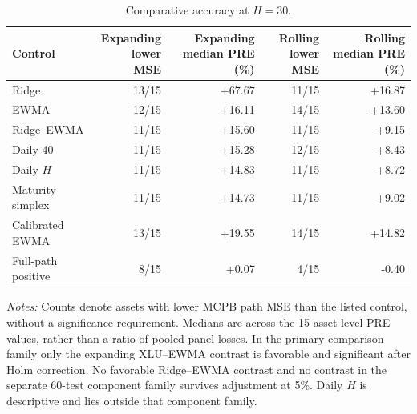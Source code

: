 \begin{table}[tbp]
\centering\small
\setlength{\tabcolsep}{4pt}
\renewcommand{\arraystretch}{1.12}
\caption{Comparative accuracy at $H=30$.}
\label{tab:summary}
\begin{tabular}{lrrrr}
\toprule
Control & \shortstack{Expanding\\lower MSE} & \shortstack{Expanding\\median PRE (\%)} & \shortstack{Rolling\\lower MSE} & \shortstack{Rolling\\median PRE (\%)} \\
\midrule
Ridge & 13/15 & +67.67 & 11/15 & +16.87 \\
EWMA & 12/15 & +16.11 & 14/15 & +13.60 \\
Ridge--EWMA & 11/15 & +15.60 & 11/15 & +9.15 \\
Daily 40 & 11/15 & +15.28 & 12/15 & +8.43 \\
Daily $H$ & 11/15 & +14.83 & 11/15 & +8.72 \\
Maturity simplex & 11/15 & +14.73 & 11/15 & +9.02 \\
Calibrated EWMA & 13/15 & +19.55 & 14/15 & +14.82 \\
Full-path positive & 8/15 & +0.07 & 4/15 & -0.40 \\
\bottomrule
\end{tabular}
\par\smallskip
\begin{minipage}{0.98\linewidth}\footnotesize
\textit{Notes:} Counts denote assets with lower MCPB path MSE than the listed control, without a significance requirement. Medians are across the 15 asset-level PRE values, rather than a ratio of pooled panel losses. In the primary comparison family only the expanding XLU--EWMA contrast is favorable and significant after Holm correction. No favorable Ridge--EWMA contrast and no contrast in the separate 60-test component family survives adjustment at 5\%. Daily $H$ is descriptive and lies outside that component family.
\end{minipage}
\end{table}
